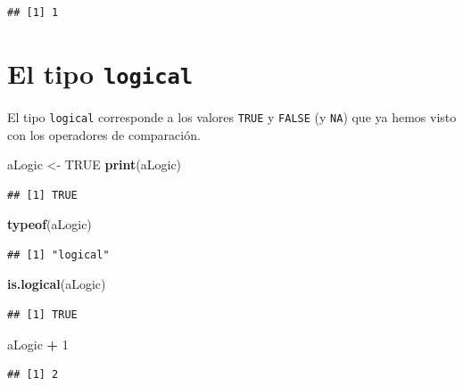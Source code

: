 \documentclass[
]{book}
\newenvironment{Shaded}{\begin{snugshade}}{\end{snugshade}}
\newcommand{\DecValTok}[1]{\textcolor[rgb]{0.00,0.00,0.81}{#1}}
\newcommand{\KeywordTok}[1]{\textcolor[rgb]{0.13,0.29,0.53}{\textbf{#1}}}
\newcommand{\NormalTok}[1]{#1}
\newcommand{\OperatorTok}[1]{\textcolor[rgb]{0.81,0.36,0.00}{\textbf{#1}}}
\newcommand{\OtherTok}[1]{\textcolor[rgb]{0.56,0.35,0.01}{#1}}
\newcommand{\StringTok}[1]{\textcolor[rgb]{0.31,0.60,0.02}{#1}}
\begin{document}
\begin{verbatim}
## [1] 1
\end{verbatim}

\hypertarget{l013logi}{%
\section{\texorpdfstring{El tipo \texttt{logical}}{El tipo logical}}\label{l013logi}}

El tipo \texttt{logical} corresponde a los valores \texttt{TRUE} y \texttt{FALSE} (y \texttt{NA}) que ya hemos visto con los operadores de comparación.

\begin{Shaded}
\begin{Highlighting}[]
\NormalTok{aLogic <-}\StringTok{ }\OtherTok{TRUE}
\KeywordTok{print}\NormalTok{(aLogic)}
\end{Highlighting}
\end{Shaded}

\begin{verbatim}
## [1] TRUE
\end{verbatim}

\begin{Shaded}
\begin{Highlighting}[]
\KeywordTok{typeof}\NormalTok{(aLogic)}
\end{Highlighting}
\end{Shaded}

\begin{verbatim}
## [1] "logical"
\end{verbatim}

\begin{Shaded}
\begin{Highlighting}[]
\KeywordTok{is.logical}\NormalTok{(aLogic)}
\end{Highlighting}
\end{Shaded}

\begin{verbatim}
## [1] TRUE
\end{verbatim}

\begin{Shaded}
\begin{Highlighting}[]
\NormalTok{aLogic }\OperatorTok{+}\StringTok{ }\DecValTok{1}
\end{Highlighting}
\end{Shaded}

\begin{verbatim}
## [1] 2
\end{verbatim}
\end{document}
